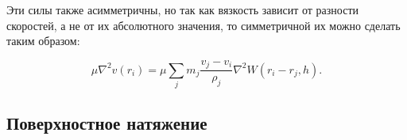 Эти силы также асимметричны, но так как вязкость зависит от разности скоростей,
а не от их абсолютного значения, то симметричной их можно сделать таким образом:

\begin{equation}
	\mu \nabla^2 v(r_i) = \mu \sum_j m_j \frac{v_j - v_i}{\rho_j} \nabla^2 W(r_i - r_j, h).
\end{equation}

\subsection{Поверхностное натяжение}

%
